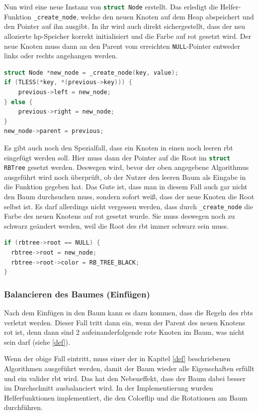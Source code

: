 \documentclass[11pt]{article}
\newcommand{\lstin}[1]{\lstinline[language=C]{#1}}
\begin{document}
Nun wird eine neue Instanz von \lstin{struct Node} erstellt. Das erledigt die Helfer-Funktion \lstin{_create_node}, welche den neuen Knoten auf dem Heap abspeichert und den Pointer auf ihn ausgibt.
In ihr wird auch direkt sichergestellt, dass der neu allozierte \gls{hp}-Speicher korrekt initialisiert und die Farbe auf rot gesetzt wird.
Der neue Knoten muss dann an den Parent vom erreichten \lstin{NULL}-Pointer entweder links oder rechts angehangen werden.

\begin{lstlisting}[language=C]
struct Node *new_node = _create_node(key, value);
if (TLESS(*key, *(previous->key))) {
    previous->left = new_node;
} else {
    previous->right = new_node;
}
new_node->parent = previous;
\end{lstlisting}

Es gibt auch noch den Spezialfall, dass ein Knoten in einen noch leeren \gls{rbt} eingefügt werden soll.
Hier muss dann der Pointer auf die Root im \lstin{struct RBTree} gesetzt werden. Deswegen wird, bevor der oben angegebene Algorithmus ausgeführt wird noch überprüft,
ob der Nutzer den leeren Baum als Eingabe in die Funktion gegeben hat.
Das Gute ist, dass man in diesem Fall auch gar nicht den Baum durchsuchen muss, sondern sofort weiß, dass der neue Knoten die Root selbst ist.
Es darf allerdings nicht vergessen werden, dass durch \lstin{_create_node} die Farbe des neuen Knotens auf rot gesetzt wurde. Sie muss deswegen noch zu schwarz geändert werden,
weil die Root des \gls{rbt} immer schwarz sein muss.
\begin{lstlisting}[language=C]
if (rbtree->root == NULL) {
  rbtree->root = new_node;
  rbtree->root->color = RB_TREE_BLACK;
}
\end{lstlisting}

\subsubsection{Balancieren des Baumes (Einfügen)}
Nach dem Einfügen in den Baum kann es dazu kommen, dass die Regeln des \glspl{rbt} verletzt werden.
Dieser Fall tritt dann ein, wenn der Parent des neuen Knotens rot ist, denn dann sind 2 aufeinanderfolgende rote Knoten im Baum, was nicht sein darf (siehe \ref{def}).

Wenn der obige Fall eintritt, muss einer der in Kapitel \ref{def} beschriebenen Algorithmen ausgeführt werden, damit der Baum wieder alle Eigenschaften erfüllt und ein valider \gls{rbt} wird.
Das hat den Nebeneffekt, dass der Baum dabei besser im Durchschnitt ausbalanciert wird.
In der Implementierung wurden Helferfunktionen implementiert, die den Colorflip und die Rotationen am Baum durchführen.
\end{document}
